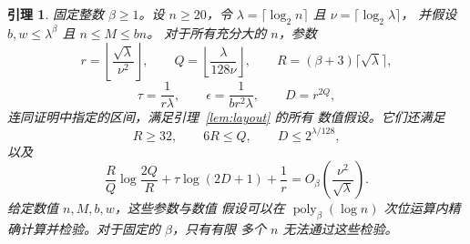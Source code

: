 \documentclass[11pt,reqno]{amsart}
\numberwithin{equation}{section}
\newtheorem{lemma}[theorem]{引理}
\theoremstyle{definition}\newtheorem{definition}[theorem]{定义}
\theoremstyle{remark}\newtheorem{remark}[theorem]{注}
\newcommand{\poly}{\operatorname{poly}}
\renewcommand{\le}{\leqslant}
\renewcommand{\ge}{\geqslant}
\begin{document}
\begin{lemma}\label{lem:incidence-parameters}
固定整数 $\beta\ge1$。设 $n\ge20$，令
$\lambda=\lceil\log_2 n\rceil$ 且 $\nu=\lceil\log_2\lambda\rceil$，
并假设 $b,w\le\lambda^\beta$ 且 $n\le M\le bn$。
对于所有充分大的 $n$，参数
\begin{equation}\label{eq:parameter-QR}
 r=\left\lfloor\frac{\sqrt\lambda}{\nu^2}\right\rfloor,
 \qquad Q=\left\lfloor\frac{\lambda}{128\nu}\right\rfloor,
 \qquad R=(\beta+3)\lceil\sqrt\lambda\rceil,
\end{equation}
\[
 \tau=\frac1{r\lambda},\qquad
 \epsilon=\frac1{br^2\lambda},\qquad D=r^{2Q},
\]
连同证明中指定的区间，满足引理~\ref{lem:layout} 的所有
数值假设。它们还满足
\[
 R\ge32,\qquad 6R\le Q,\qquad D\le2^{\lambda/128},
\]
以及
\begin{equation}\label{eq:balanced-cost}
 \frac RQ\log\frac{2Q}{R}+\tau\log(2D+1)+\frac1r
 =O_\beta\!\left(\frac{\nu^2}{\sqrt\lambda}\right).
\end{equation}
给定数值 $n,M,b,w$，这些参数与数值
假设可以在 $\poly_\beta(\log n)$ 次位运算内精确计算并检验。对于固定的 $\beta$，只有有限
多个 $n$ 无法通过这些检验。
\end{lemma}
\end{document}
